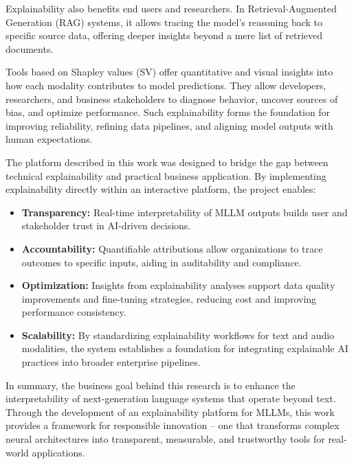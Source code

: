 Explainability also benefits end users and researchers. In Retrieval-Augmented Generation (RAG) systems, it allows tracing the model’s reasoning back to specific source data, offering deeper insights beyond a mere list of retrieved documents.

Tools based on Shapley values (SV) offer quantitative and visual insights into how each modality contributes to model predictions. They allow developers, researchers, and business stakeholders to diagnose behavior, uncover sources of bias, and optimize performance. Such explainability forms the foundation for improving reliability, refining data pipelines, and aligning model outputs with human expectations.

The platform described in this work was designed to bridge the gap between technical explainability and practical business application. By implementing explainability directly within an interactive platform, the project enables:

\begin{itemize}

    \item \textbf{Transparency:} Real-time interpretability of MLLM outputs builds user and stakeholder trust in AI-driven decisions.

    \item \textbf{Accountability:} Quantifiable attributions allow organizations to trace outcomes to specific inputs, aiding in auditability and compliance.

    \item \textbf{Optimization:} Insights from explainability analyses support data quality improvements and fine-tuning strategies, reducing cost and improving performance consistency.

    \item \textbf{Scalability:} By standardizing explainability workflows for text and audio modalities, the system establishes a foundation for integrating explainable AI practices into broader enterprise pipelines.

\end{itemize}

In summary, the business goal behind this research is to enhance the interpretability of next-generation language systems that operate beyond text. Through the development
of an explainability platform for MLLMs, this work provides a framework for responsible innovation -- one that transforms complex neural architectures into transparent, measurable, and trustworthy tools for real-world applications.

